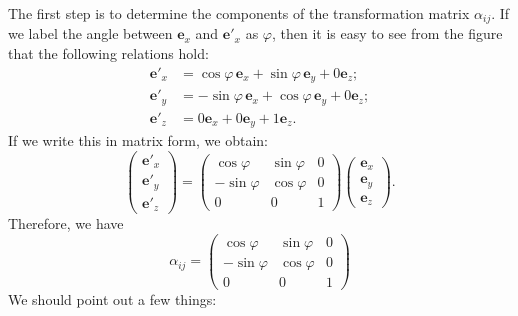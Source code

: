 The first step is to determine the components of the transformation matrix $\alpha_{ij}$.  If we label the angle between $\mathbf{e}_{x}$
and $\mathbf{e}'_{x}$ as $\varphi$, then it is easy to see from the figure that the following relations hold:
\begin{align*}
	\mathbf{e}'_{x} &= \cos\varphi\,\mathbf{e}_{x} + \sin\varphi\,\mathbf{e}_{y} + 0\mathbf{e}_{z};\\
	\mathbf{e}'_{y} &= -\sin\varphi\,\mathbf{e}_{x} + \cos\varphi\,\mathbf{e}_{y} + 0\mathbf{e}_{z};\\
	\mathbf{e}'_{z} &= 0\mathbf{e}_{x} + 0\mathbf{e}_{y} + 1\mathbf{e}_{z}.
\end{align*}
If we write this in matrix form, we obtain:
\begin{equation}
	\left(\begin{array}{c}\mathbf{e}'_{x}\\ \mathbf{e}'_{y}\\ \mathbf{e}'_{z}\end{array}\right) = 
	\left(\begin{array}{ccc}\cos\varphi & \sin\varphi & 0\\
	-\sin\varphi&\cos\varphi&0\\
	0&0&1\end{array}\right)\left(\begin{array}{c}\mathbf{e}_{x}\\ \mathbf{e}_{y}\\ \mathbf{e}_{z}\end{array}\right).
\end{equation}
Therefore, we have 
\begin{equation}
	\alpha_{ij} = \left(\begin{array}{ccc}\cos\varphi & \sin\varphi & 0\\
	-\sin\varphi&\cos\varphi&0\\
	0&0&1\end{array}\right)
\end{equation}
We should point out a few things:

